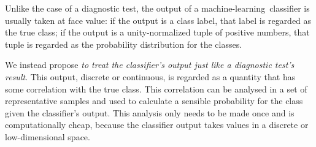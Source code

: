 \documentclass[\ifafour a4paper,12pt,\else a5paper,10pt,\fi%
onecolumn,oneside,article,%
british%
]{memoir}
\theoremstyle{remark}
\theoremstyle{innote}
\renewcommand*{\|}[1][]{\nonscript\:#1\vert\nonscript\:\mathopen{}}
\newcommand*{\ml}{machine-learning}
\begin{document}
\medskip

Unlike the case of a diagnostic test, the output of a \ml\ classifier is usually taken at face value: if the output is a class label, that label is regarded as the true class; if the output is a unity-normalized tuple of positive numbers, that tuple is regarded as the probability distribution for the classes.

We instead propose \emph{to treat the classifier's output just like a diagnostic test's result}. This output, discrete or continuous, is regarded as a quantity that has some correlation with the true class. This correlation can be analysed in a set of representative samples and used to calculate a sensible probability for the class given the classifier's output. This analysis only needs to be made once and is computationally cheap, because the classifier output takes values in a discrete or low-dimensional space.



\end{document}
